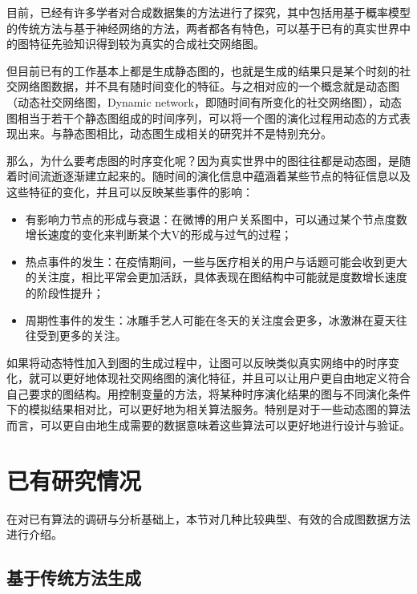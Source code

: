 目前，已经有许多学者对合成数据集的方法进行了探究，其中包括用基于概率模型的传统方法与基于神经网络的方法，两者都各有特色，可以基于已有的真实世界中的图特征先验知识得到较为真实的合成社交网络图。

但目前已有的工作基本上都是生成静态图的，也就是生成的结果只是某个时刻的社交网络图数据，并不具有随时间变化的特征。与之相对应的一个概念就是动态图（动态社交网络图，Dynamic network，即随时间有所变化的社交网络图\cite{sarkar2006dynamic}），动态图相当于若干个静态图组成的时间序列，可以将一个图的演化过程用动态的方式表现出来。与静态图相比，动态图生成相关的研究并不是特别充分。

那么，为什么要考虑图的时序变化呢？因为真实世界中的图往往都是动态图，是随着时间流逝逐渐建立起来的。随时间的演化信息中蕴涵着某些节点的特征信息以及这些特征的变化，并且可以反映某些事件的影响：

\begin{itemize}
  \item 有影响力节点的形成与衰退\cite{braha2006centrality}：在微博的用户关系图中，可以通过某个节点度数增长速度的变化来判断某个大V的形成与过气的过程；
  \item 热点事件的发生：在疫情期间，一些与医疗相关的用户与话题可能会收到更大的关注度，相比平常会更加活跃，具体表现在图结构中可能就是度数增长速度的阶段性提升；
  \item 周期性事件的发生：冰雕手艺人可能在冬天的关注度会更多，冰激淋在夏天往往受到更多的关注。
\end{itemize}

\vspace{0.2cm}

如果将动态特性加入到图的生成过程中，让图可以反映类似真实网络中的时序变化，就可以更好地体现社交网络图的演化特征，并且可以让用户更自由地定义符合自己要求的图结构。用控制变量的方法，将某种时序演化结果的图与不同演化条件下的模拟结果相对比，可以更好地为相关算法服务。特别是对于一些动态图的算法而言，可以更自由地生成需要的数据意味着这些算法可以更好地进行设计与验证。

\section{已有研究情况}

在对已有算法的调研与分析基础上，本节对几种比较典型、有效的合成图数据方法进行介绍。

\subsection{基于传统方法生成}

